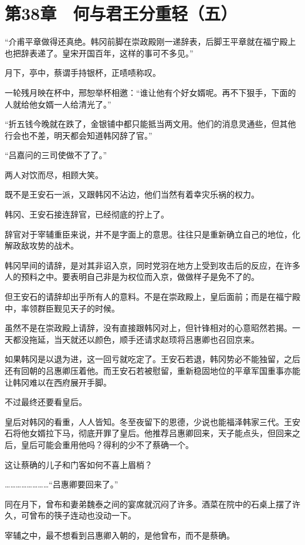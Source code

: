 \section{第38章　何与君王分重轻（五）}

“介甫平章做得还真绝。韩冈前脚在崇政殿刚一递辞表，后脚王平章就在福宁殿上也把辞表递了。皇宋开国百年，这样的事可不多见。”

月下，亭中，蔡谓手持银杯，正啧啧称叹。

一轮残月映在杯中，邢恕举杯相邀：“谁让他有个好女婿呢。再不下狠手，下面的人就给他女婿一人给清光了。”

“折五钱今晚就在跌了，金银铺中都只能抵当两文用。他们的消息灵通些，但其他行会也不差，明天都会知道韩冈辞了官。”

“吕嘉问的三司使做不了了。”

两人对饮而尽，相顾大笑。

既不是王安石一派，又跟韩冈不沾边，他们当然有着幸灾乐祸的权力。

韩冈、王安石接连辞官，已经彻底的拧上了。

辞官对于宰辅重臣来说，并不是字面上的意思。往往只是重新确立自己的地位，化解政敌攻势的战术。

韩冈早间的请辞，是对其非诏入京，同时党羽在地方上受到攻击后的反应，在许多人的预料之中。要表明自己非是为权位而入京，做做样子是免不了的。

但王安石的请辞却出乎所有人的意料。不是在崇政殿上，皇后面前；而是在福宁殿中，率领群臣觐见天子的时候。

虽然不是在崇政殿上请辞，没有直接跟韩冈对上，但针锋相对的心意昭然若揭。一天都没拖延，当天就还以颜色，顺手还请求赵顼将吕惠卿也召回京来。

如果韩冈是以退为进，这一回亏就吃定了。王安石若退，韩冈势必不能独留，之后还有回朝的吕惠卿压着他。而王安石若被慰留，重新稳固地位的平章军国重事亦能让韩冈难以在西府展开手脚。

不过最终还要看皇后。

皇后对韩冈的看重，人人皆知。冬至夜留下的恩德，少说也能福泽韩家三代。王安石将他女婿拉下马，彻底开罪了皇后。他推荐吕惠卿回来，天子能点头，但回来之后，皇后可能会重用他吗？得利的少不了蔡确一个。

这让蔡确的儿子和门客如何不喜上眉梢？

……………………“吕惠卿要回来了。”

同在月下，曾布和妻弟魏泰之间的宴席就沉闷了许多。酒菜在院中的石桌上摆了许久，可曾布的筷子连动也没动一下。

宰辅之中，最不想看到吕惠卿入朝的，是他曾布，而不是蔡确。

